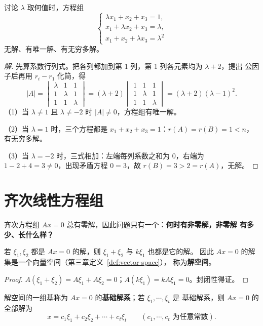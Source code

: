 \begin{example}\label{ex:param-system}
讨论 $\lambda$ 取何值时，方程组
\[
  \begin{cases}
    \lambda x_1+x_2+x_3=1, \\
    x_1+\lambda x_2+x_3=\lambda, \\
    x_1+x_2+\lambda x_3=\lambda^2
  \end{cases}
\]
无解、有唯一解、有无穷多解。
\end{example}
\begin{proof}[解]
先算系数行列式。把各列都加到第 1 列，第 1 列各元素均为 $\lambda+2$，提出
公因子后再用 $r_i-r_1$ 化简，得
\[
  |A|=\begin{vmatrix} \lambda & 1 & 1 \\ 1 & \lambda & 1 \\ 1 & 1 & \lambda \end{vmatrix}
      =(\lambda+2)\begin{vmatrix} 1 & 1 & 1 \\ 1 & \lambda & 1 \\ 1 & 1 & \lambda \end{vmatrix}
      =(\lambda+2)(\lambda-1)^2 .
\]
（1）当 $\lambda\neq1$ 且 $\lambda\neq-2$ 时 $|A|\neq0$，方程组有唯一解。

（2）当 $\lambda=1$ 时，三个方程都是 $x_1+x_2+x_3=1$：$r(A)=r(B)=1<n$，
有无穷多解。

（3）当 $\lambda=-2$ 时，三式相加：左端每列系数之和为 $0$，右端为
$1-2+4=3\neq0$，出现矛盾方程 $0=3$，故 $r(B)=3>2=r(A)$，无解。
\end{proof}

\section{齐次线性方程组}\label{sec:homogeneous}

齐次方程组 $Ax=0$ 总有零解，因此问题只有一个：\textbf{何时有非零解，非零解
有多少、长什么样？}

\begin{proposition}\label{prop:solution-space}
若 $\xi_1,\xi_2$ 都是 $Ax=0$ 的解，则 $\xi_1+\xi_2$ 与 $k\xi_1$ 也都是它的解。
因此 $Ax=0$ 的解集是一个向量空间（第三章定义~\ref{def:vector-space}），
称为\textbf{解空间}。
\end{proposition}
\begin{proof}
$A(\xi_1+\xi_2)=A\xi_1+A\xi_2=0$；$A(k\xi_1)=kA\xi_1=0$。封闭性得证。
\end{proof}

\begin{definition}\label{def:fundamental}
解空间的一组基称为 $Ax=0$ 的\textbf{基础解系}；若 $\xi_1,\cdots,\xi_t$ 是
基础解系，则 $Ax=0$ 的全部解为
\[
  x=c_1\xi_1+c_2\xi_2+\cdots+c_t\xi_t\qquad(c_1,\cdots,c_t\text{ 为任意常数}).
\]
\end{definition}

